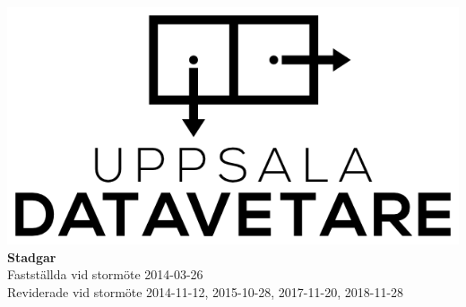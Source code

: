 \documentclass[a4paper]{article}
\begin{document}
\begin{titlepage}
  \vspace*{\fill}
  \centering
  \vfill
  \vfill
  \includegraphics[width=\textwidth]{UD_center.png}
  {\huge\textbf{Stadgar}\\
    \vspace{0.3em}
    \large{Fastställda vid stormöte 2014-03-26\\
      Reviderade vid stormöte 2014-11-12, 2015-10-28, 2017-11-20, 2018-11-28}}
  \vfill
  \vfill
  \vspace*{\fill}
\end{titlepage}
\renewcommand{\contentsname}{Innehåll\hfill\small Sida}
\tableofcontents
\cleardoublepage 
\setcounter{page}{1}
\cfoot{\thepage}
\end{document}

